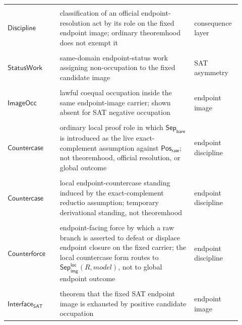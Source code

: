 \documentclass[11pt]{article}
\theoremstyle{definition}
\theoremstyle{remark}
\newcommand{\PosRaw}{\mathsf{Pos}_{\mathsf{raw}}}
\newcommand{\SepBare}{\mathsf{Sep}_{\mathsf{bare}}}
\newcommand{\LocalSepImgOcc}{\mathsf{Sep}_{\mathsf{img}}^{\mathsf{loc}}}
\begin{document}
\begin{longtable}{>{\raggedright\arraybackslash}p{0.21\linewidth}>{\raggedright\arraybackslash}p{0.54\linewidth}>{\raggedright\arraybackslash}p{0.17\linewidth}}
\begin{tabular}[t]{@{}l@{}}\(\mathsf{EndpointRole}\)\\\(\mathsf{Discipline}\)\end{tabular} & classification of an official endpoint-resolution act by its role on the fixed endpoint image; ordinary theoremhood does not exempt it & consequence layer \\
\begin{tabular}[t]{@{}l@{}}\(\mathsf{NonPositive}\)\\\(\mathsf{StatusWork}\)\end{tabular} & same-domain endpoint-status work assigning non-occupation to the fixed candidate image & SAT asymmetry \\
\begin{tabular}[t]{@{}l@{}}\(\mathsf{LawfulCoequal}\)\\\(\mathsf{ImageOcc}\)\end{tabular} & lawful coequal occupation inside the same endpoint-image carrier; shown absent for SAT negative occupation & endpoint image \\
\begin{tabular}[t]{@{}l@{}}\(\mathsf{Reductio}\)\\\(\mathsf{Countercase}\)\end{tabular} & ordinary local proof role in which \(\SepBare\) is introduced as the live exact-complement assumption against \(\PosRaw\); not theoremhood, official resolution, or global outcome & endpoint discipline \\
\begin{tabular}[t]{@{}l@{}}\(\mathsf{Local}\)\\\(\mathsf{Countercase}\)\end{tabular} & local endpoint-countercase standing induced by the exact-complement reductio assumption; temporary derivational standing, not theoremhood & endpoint discipline \\
\begin{tabular}[t]{@{}l@{}}\(\mathsf{Endpoint}\)\\\(\mathsf{Counterforce}\)\end{tabular} & endpoint-facing force by which a raw branch is asserted to defeat or displace endpoint closure on the fixed carrier; the local countercase form routes to \(\LocalSepImgOcc(R,model)\), not to global endpoint outcome & endpoint discipline \\
\begin{tabular}[t]{@{}l@{}}\(\mathsf{SingleOcc}\)\\\(\mathsf{Interface}_{\mathsf{SAT}}\)\end{tabular} & theorem that the fixed SAT endpoint image is exhausted by positive candidate occupation & endpoint image \\

\end{longtable}
\end{document}
